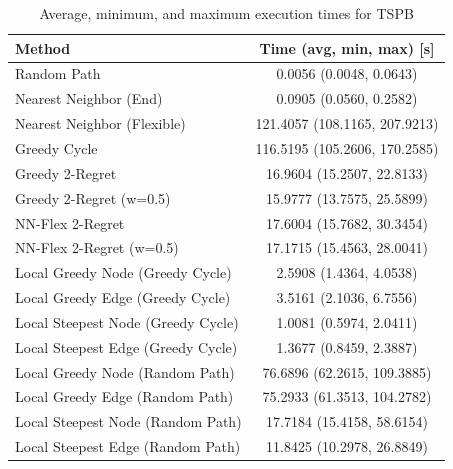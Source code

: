 \begin{table}[h!]
\centering
\begin{tabular}{lc}
\hline
Method & Time (avg, min, max) [s] \\
\hline
Random Path & 0.0056 (0.0048, 0.0643) \\
Nearest Neighbor (End) & 0.0905 (0.0560, 0.2582) \\
Nearest Neighbor (Flexible) & 121.4057 (108.1165, 207.9213) \\
Greedy Cycle & 116.5195 (105.2606, 170.2585) \\
Greedy 2-Regret & 16.9604 (15.2507, 22.8133) \\
Greedy 2-Regret (w=0.5) & 15.9777 (13.7575, 25.5899) \\
NN-Flex 2-Regret & 17.6004 (15.7682, 30.3454) \\
NN-Flex 2-Regret (w=0.5) & 17.1715 (15.4563, 28.0041) \\
Local Greedy Node (Greedy Cycle) & 2.5908 (1.4364, 4.0538) \\
Local Greedy Edge (Greedy Cycle) & 3.5161 (2.1036, 6.7556) \\
Local Steepest Node (Greedy Cycle) & 1.0081 (0.5974, 2.0411) \\
Local Steepest Edge (Greedy Cycle) & 1.3677 (0.8459, 2.3887) \\
Local Greedy Node (Random Path) & 76.6896 (62.2615, 109.3885) \\
Local Greedy Edge (Random Path) & 75.2933 (61.3513, 104.2782) \\
Local Steepest Node (Random Path) & 17.7184 (15.4158, 58.6154) \\
Local Steepest Edge (Random Path) & 11.8425 (10.2978, 26.8849) \\
\hline
\end{tabular}
\caption{Average, minimum, and maximum execution times for TSPB}
\label{tab:TSPB_timings}
\end{table}
